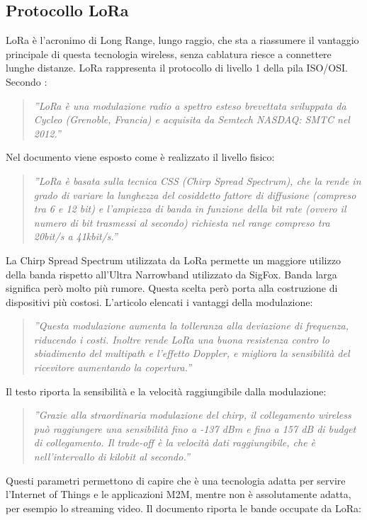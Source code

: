 \documentclass[a4paper]{report} %
\begin{document}
\subsection{Protocollo LoRa}
LoRa è l'acronimo di Long Range, lungo raggio, che sta a riassumere il vantaggio principale di questa tecnologia wireless, senza cablatura riesce a connettere lunghe distanze. LoRa rappresenta il protocollo di livello 1 della pila ISO/OSI. Secondo \cite{art:rif.30}:
\begin{quote}
	\textit{''LoRa è una modulazione radio a spettro esteso brevettata sviluppata da Cycleo (Grenoble, Francia) e acquisita da Semtech NASDAQ: SMTC nel 2012.''}
\end{quote}
Nel documento \cite{art:rif.23} viene esposto come è realizzato il livello fisico:
\begin{quote}
	\textit{''LoRa è basata sulla tecnica CSS (Chirp Spread Spectrum), che la rende in grado di variare la lunghezza del cosiddetto fattore di diffusione (compreso tra 6 e 12 bit) e l'ampiezza di banda in funzione della bit rate (ovvero il numero di bit trasmessi al secondo) richiesta nel range compreso tra 20bit/s a 41kbit/s.''}
\end{quote}
La Chirp Spread Spectrum utilizzata da LoRa permette un maggiore utilizzo della banda rispetto all'Ultra Narrowband utilizzato da SigFox. Banda larga significa però molto più rumore. Questa scelta però porta alla costruzione di dispositivi più costosi. L'articolo \cite{art:rif.44} elencati i vantaggi della modulazione:
\begin{quote}
	\textit{''Questa modulazione aumenta la tolleranza alla deviazione di frequenza, riducendo i costi. Inoltre rende LoRa una buona resistenza contro lo sbiadimento del multipath e l'effetto Doppler, e migliora la sensibilità del ricevitore aumentando la copertura.''}
\end{quote}
Il testo \cite{art:rif.30} riporta la sensibilità e la velocità raggiungibile dalla modulazione:
\begin{quote}
	\textit{''Grazie alla straordinaria modulazione del chirp, il collegamento wireless può raggiungere una sensibilità fino a -137 dBm e fino a 157 dB di budget di collegamento. Il trade-off è la velocità dati raggiungibile, che è nell'intervallo di kilobit al secondo.''}
\end{quote}
Questi parametri permettono di capire che è una tecnologia adatta per servire l'Internet of Things e le applicazioni M2M, mentre non è assolutamente adatta, per esempio lo streaming video. Il documento \cite{art:rif.30} riporta le bande occupate da LoRa: 
\end{document}
